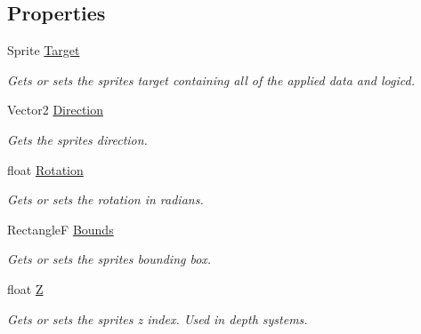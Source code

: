 \subsection*{Properties}
\begin{DoxyCompactItemize}
\item 
Sprite \hyperlink{class_m_b2_d_1_1_entity_component_1_1_sprite_transform_a31edaa3c4ce6d37d74b639032be4f845}{Target}
\begin{DoxyCompactList}\small\item\em Gets or sets the sprites target containing all of the applied data and logicd. \end{DoxyCompactList}\item 
Vector2 \hyperlink{class_m_b2_d_1_1_entity_component_1_1_sprite_transform_a0cd51eee71ba1b1f548e0950c05a8e12}{Direction}
\begin{DoxyCompactList}\small\item\em Gets the sprites direction. \end{DoxyCompactList}\item 
float \hyperlink{class_m_b2_d_1_1_entity_component_1_1_sprite_transform_a6220a2c6ca43613d77065ec9eddc99dd}{Rotation}
\begin{DoxyCompactList}\small\item\em Gets or sets the rotation in radians. \end{DoxyCompactList}\item 
RectangleF \hyperlink{class_m_b2_d_1_1_entity_component_1_1_sprite_transform_a1b712a2eaabf39b3aa697054ba4a1904}{Bounds}
\begin{DoxyCompactList}\small\item\em Gets or sets the sprites bounding box. \end{DoxyCompactList}\item 
float \hyperlink{class_m_b2_d_1_1_entity_component_1_1_sprite_transform_a312bac0f6e60d258adce879f4d3da2e7}{Z}
\begin{DoxyCompactList}\small\item\em Gets or sets the sprites z index. Used in depth systems. \end{DoxyCompactList}\end{DoxyCompactItemize}


